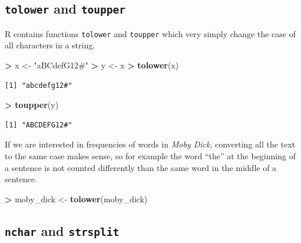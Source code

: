 \documentclass[]{krantz}
\makeatletter
\newenvironment{Shaded}{\begin{snugshade}}{\end{snugshade}}
\newcommand{\KeywordTok}[1]{\textcolor[rgb]{0.27,0.27,0.27}{\textbf{#1}}}
\newcommand{\StringTok}[1]{\textcolor[rgb]{0.5,0.5,0.5}{#1}}
\newcommand{\OperatorTok}[1]{\textcolor[rgb]{0.43,0.43,0.43}{\textbf{#1}}}
\newcommand{\NormalTok}[1]{#1}
\newenvironment{kframe}{%
\medskip{}
\setlength{\fboxsep}{.8em}
 \def\at@end@of@kframe{}%
 \ifinner\ifhmode%
  \def\at@end@of@kframe{\end{minipage}}%
  \begin{minipage}{\columnwidth}%
 \fi\fi%
 \def\FrameCommand##1{\hskip\@totalleftmargin \hskip-\fboxsep
 \colorbox{shadecolor}{##1}\hskip-\fboxsep
     \hskip-\linewidth \hskip-\@totalleftmargin \hskip\columnwidth}%
 \MakeFramed {\advance\hsize-\width
   \@totalleftmargin\z@ \linewidth\hsize
   \@setminipage}}%
 {\par\unskip\endMakeFramed%
 \at@end@of@kframe}
\renewenvironment{Shaded}{\begin{kframe}}{\end{kframe}}
\makeatother
\begin{document}
\subsection{\texorpdfstring{\texttt{tolower} and
\texttt{toupper}}{tolower and toupper}}\label{tolower-and-toupper}

R contains functions \texttt{tolower} and \texttt{toupper} which very
simply change the case of all characters in a string.

\begin{Shaded}
\begin{Highlighting}[]
\OperatorTok{>}\StringTok{ }\NormalTok{x <-}\StringTok{ "aBCdefG12#"}
\OperatorTok{>}\StringTok{ }\NormalTok{y <-}\StringTok{ }\NormalTok{x}
\OperatorTok{>}\StringTok{ }\KeywordTok{tolower}\NormalTok{(x)}
\end{Highlighting}
\end{Shaded}

\begin{verbatim}
[1] "abcdefg12#"
\end{verbatim}

\begin{Shaded}
\begin{Highlighting}[]
\OperatorTok{>}\StringTok{ }\KeywordTok{toupper}\NormalTok{(y)}
\end{Highlighting}
\end{Shaded}

\begin{verbatim}
[1] "ABCDEFG12#"
\end{verbatim}

If we are interested in frequencies of words in \emph{Moby Dick},
converting all the text to the same case makes sense, so for example the
word ``the'' at the beginning of a sentence is not counted differently
than the same word in the middle of a sentence.

\begin{Shaded}
\begin{Highlighting}[]
\OperatorTok{>}\StringTok{ }\NormalTok{moby_dick <-}\StringTok{ }\KeywordTok{tolower}\NormalTok{(moby_dick)}
\end{Highlighting}
\end{Shaded}

\subsection{\texorpdfstring{\texttt{nchar} and
\texttt{strsplit}}{nchar and strsplit}}\label{nchar-and-strsplit}
\end{document}
